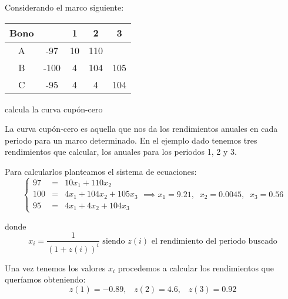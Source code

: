 \begin{problem}[10]
Considerando el marco siguiente:
\begin{center}
\begin{tabular}{|c|c|c|c|c|}
\hline
\textbf{Bono } & & 1 & 2 & 3 \\
\hline
A & -97 & 10 & 110 & \\
B & -100 & 4 & 104 & 105 \\
C & -95 & 4 & 4 & 104 \\
\hline
\end{tabular}
\end{center}
calcula la curva cupón-cero
\solution

La curva cupón-cero es aquella que nos da los rendimientos anuales en cada periodo para un marco determinado. En el ejemplo dado tenemos tres rendimientos que calcular, los anuales para los periodos 1, 2 y 3.

Para calcularlos planteamos el sistema de ecuaciones:
\[\left\{\begin{array}{lll}
97 & = & 10x_1 + 110x_2\\
100 & = & 4x_1 + 104 x_2 + 105x_3\\
95 & = & 4x_1+4x_2 + 104x_3
\end{array}\right. \implies x_1=9.21, \;\; x_2=0.0045, \;\; x_3 = 0.56\]

donde
\[x_i = \frac{1}{(1+z(i))^i} \text{ siendo } z(i) \text{ el rendimiento del periodo buscado}\]

Una vez tenemos los valores $x_i$ procedemos a calcular los rendimientos que queríamos obteniendo:
\[z(1) = -0.89, \;\;\; z(2) = 4.6, \;\;\; z(3) = 0.92\]
\end{problem}

